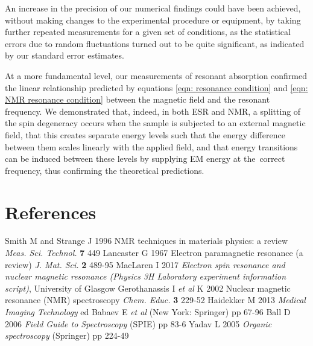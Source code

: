 \documentclass[a4paper]{jpconf}
\numberwithin{equation}{section}
\begin{document}
An increase in the precision of our numerical findings could have been achieved, without making changes to the experimental procedure or equipment, by taking further repeated measurements for a given set of conditions, as the statistical errors due to random fluctuations turned out to be quite significant, as indicated by our standard error estimates. 

At a more fundamental level, our measurements of resonant absorption confirmed the linear relationship predicted by equations \eqref{eqn: resonance condition} and \eqref{eqn: NMR resonance condition} between the magnetic field and the resonant frequency. We demonstrated that, indeed, in both ESR and NMR, a splitting of the spin degeneracy occurs when the sample is subjected to an external magnetic field, that this creates separate energy levels such that the energy difference between them scales linearly with the applied field, and that energy transitions can be induced between these levels by supplying EM energy at the~correct frequency, thus confirming the theoretical predictions. 



\section*{References}
\begin{thebibliography}{9}
 Smith M and Strange J 1996 NMR techniques in materials physics: a review \textit{Meas. Sci. Technol.} \textbf{7} 449
 Lancaster G 1967 Electron paramagnetic resonance (a review) \textit{J. Mat. Sci.} \textbf{2} 489-95
 MacLaren I 2017 \textit{Electron spin resonance and nuclear magnetic resonance (Physics 3H Laboratory experiment information script)}, University of Glasgow
 Gerothanassis I \textit{et al} K 2002 Nuclear magnetic resonance (NMR) spectroscopy \textit{Chem. Educ.} \textbf{3} 229-52
 Haidekker M 2013 \textit{Medical Imaging Technology} ed Babaev E \textit{et al} (New York: Springer) pp 67-96
 Ball D 2006 \textit{Field Guide to Spectroscopy} (SPIE) pp 83-6
 Yadav L 2005 \textit{Organic spectroscopy} (Springer) pp 224-49
\end{thebibliography}
\end{document}
